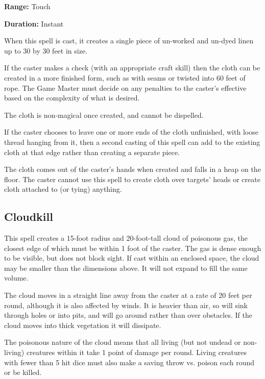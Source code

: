 \begin{multicols*}{2}
{\textbf{Range:} Touch

\textbf{Duration:} Instant}

When this spell is cast, it creates a single piece of un-worked and un-dyed linen up to 30 by 30 feet in size.

If the caster makes a  check (with an appropriate craft skill) then the cloth can be created in a more finished form, such as with seams or twisted into 60 feet of rope. The Game Master must decide on any penalties to the caster’s effective  based on the complexity of what is desired.

The cloth is non-magical once created, and cannot be dispelled.

If the caster chooses to leave one or more ends of the cloth unfinished, with loose thread hanging from it, then a second casting of this spell can add to the existing cloth at that edge rather than creating a separate piece.

The cloth comes out of the caster’s hands when created and falls in a heap on the floor. The caster cannot use this spell to create cloth over targets’ heads or create cloth attached to (or tying) anything.

\subsection{Cloudkill}\label{spell:Cloudkill}

This spell creates a 15-foot radius and 20-foot-tall cloud of poisonous gas, the closest edge of which must be within 1 foot of the caster. The gas is dense enough to be visible, but does not block sight. If cast within an enclosed space, the cloud may be smaller than the dimensions above. It will not expand to fill the same volume.

The cloud moves in a straight line away from the caster at a rate of 20 feet per round, although it is also affected by winds. It is heavier than air, so will sink through holes or into pits, and will go around rather than over obstacles. If the cloud moves into thick vegetation it will dissipate.

The poisonous nature of the cloud means that all living (but not undead or non-living) creatures within it take 1 point of damage per round. Living creatures with fewer than 5 hit dice must also make a saving throw vs. poison each round or be killed.


\end{multicols*}
